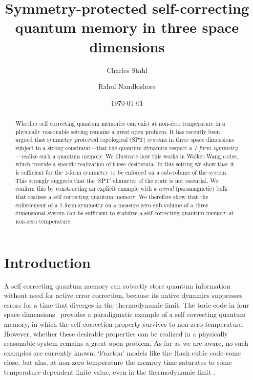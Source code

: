 \documentclass[twocolumn, longbibliography]{revtex4-2}
\begin{document}
	
\title{Symmetry-protected self-correcting quantum memory in three space dimensions}
\author{Charles Stahl}
\author{Rahul Nandkishore}

	
\begin{abstract}
Whether self correcting quantum memories can exist at non-zero temperature in a physically reasonable setting remains a great open problem. It has recently been argued \cite{RobertsBartlett} that symmetry protected topological (SPT) systems in three space dimensions subject to a strong constraint---that the quantum dynamics respect a {\it 1-form symmetry}---realize such a quantum memory. We illustrate how this works in Walker-Wang codes, which provide a specific realization of these desiderata. In this setting we show that it is sufficient for the 1-form symmetry to be enforced on a sub-volume of the system. This strongly suggests that the `SPT' character of the state is not essential. We confirm this by constructing an explicit example with a {\it trivial} (paramagnetic) bulk that realizes a self correcting quantum memory. We therefore show that the enforcement of a 1-form symmetry on a measure zero sub-volume of a three dimensional system can be sufficient to stabilize a self-correcting quantum memory at non-zero temperature. 
\end{abstract}
	
\date{\today}
	
\maketitle
	
\section{Introduction}
A self correcting quantum memory can robustly store quantum information without need for active error correction, because its native dynamics suppresses errors for a time that diverges in the thermodynamic limit. The toric code in four space dimensions~\cite{Kitaev2003} provides a paradigmatic example of a self correcting quantum memory, in which the self correction property survives to non-zero temperature. However, whether these desirable properties can be realized in a physically reasonable system remains a great open problem. As far as we are aware, no such examples are currently known. `Fracton' models like the Haah cubic code \cite{HaahCode} come close, but alas, at non-zero temperature the memory time saturates to some temperature dependent finite value, even in the thermodynamic limit \cite{Siva2017, PremHaahNandkishore}. 
\end{document}
